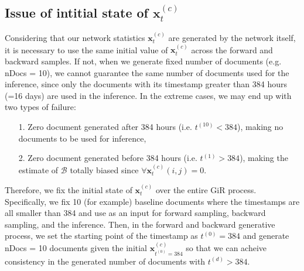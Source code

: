 \documentclass[a4paper]{article}
\begin{document}
      \subsection{Issue of intitial state of $\boldsymbol{x}_t^{(c)}$} \label{subsubsec: Initial history issue}
      Considering that our network statistics $\boldsymbol{x}_t^{(c)}$ are generated by the network itself, it is necessary to use the same initial value of $\boldsymbol{x}_t^{(c)}$ across the forward and backward samples. If not, when we generate fixed number of documents (e.g. nDocs = 10), we cannot guarantee the same number of documents used for the inference, since only the documents with its timestamp greater than 384 hours (=16 days) are used in the inference. In the extreme cases, we may end up with two types of failure:
      \begin{itemize}
      	\item[1.] Zero document generated after 384 hours (i.e. $t^{(10)} < 384$), making no documents to be used for inference,
      	\item[2.] Zero document generated before 384 hours (i.e. $t^{(1)} > 384$), making the estimate of $\mathcal{B}$ totally biased since $\forall  \boldsymbol{x}_t^{(c)}(i, j) = 0$. 
      \end{itemize}
      Therefore, we fix the initial state of $\boldsymbol{x}_t^{(c)}$ over the entire GiR process. Specifically, we fix 10 (for example) baseline documents where the timestamps are all smaller than 384 and use as an input for forward sampling, backward sampling, and the inference. Then, in the forward and backward generative process, we set the starting point of the timestamp as $t^{(0)} = 384$ and generate nDocs = 10 documents given the initial $\boldsymbol{x}_{t^{(0)} = 384}^{(c)}$ so that we can acheive consistency in the generated number of documents with $t^{(d)} > 384$.
\end{document}
